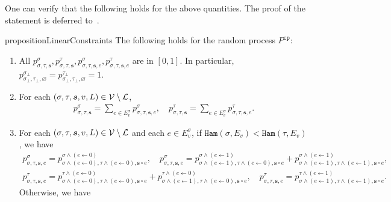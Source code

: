 \documentclass[11pt]{article}
\def\!#1{\mathtt{#1}}
\newcommand{\seqS}{\boldsymbol{s}}
\begin{document}
One can verify that the following holds for the above quantities. The proof of the statement is deferred to~.


    \begin{restatable}{proposition}{LinearConstraints}\label{prop:coupling-linear-constraint}
    The following holds for the random process $P^{\!{cp}}$:
        \begin{enumerate}[(1)]
            \item All $p^{\sigma}_{\sigma, \tau, \seqS}, p^{\tau}_{\sigma, \tau, \seqS},p^{\sigma}_{\sigma, \tau, \seqS,e}, p^{\tau}_{\sigma, \tau, \seqS,e}$ are in $[0, 1]$. 
            In particular, $p^{\sigma_\bot}_{\sigma_\bot, \tau_\bot, \varnothing} = p^{\tau_\bot}_{\sigma_\bot, \tau_\bot, \varnothing} = 1$.
            \item For each $(\sigma, \tau, \seqS, v, L)\in \+V\setminus\+L$, 
            \begin{align}\label{eqn-inter-sum1}
               p^{\sigma}_{\sigma,\tau,\seqS} = \sum_{e \in E_v^{\sigma}} p^{\sigma}_{\sigma, \tau, \seqS, e}, \quad  p^{\tau}_{\sigma,\tau,\seqS}=\sum_{e \in  E_v^{\sigma}} p^{\tau}_{\sigma,\tau, \seqS, e}.
            \end{align}
            \item For each $(\sigma, \tau, \seqS, v, L)\in \+V\setminus\+L$ and each $e\in E_v^{\sigma}$, if {${\!{Ham}\left(\sigma, {E_v}\right)} < {\!{Ham}\left(\tau,{E_v}\right)}$}, we have 
            \begin{align}\label{eqn-inner-child-sum1}
                p^{\sigma}_{\sigma,\tau, \seqS,e} = p^{\sigma \land (e\gets 0)}_{\sigma \land (e\gets 0),\tau\land (e\gets 0), \seqS \circ e}, \quad  p^{\sigma}_{\sigma, \tau, \seqS, e}=p^{\sigma\land (e\gets 1)}_{\sigma\land (e\gets 1),\tau\land (e\gets 0), \seqS\circ e} + p^{\sigma\land (e\gets 1)}_{\sigma\land (e\gets 1),\tau\land (e\gets 1),\seqS \circ e},
            \end{align}
            \begin{align}\label{eqn-inner-child-sum2}
                p^{\tau}_{\sigma, \tau, \seqS, e} = p^{\tau \land (e \gets 0)}_{\sigma \land (e\gets 0),\tau\land (e\gets 0), \seqS \circ e} + p^{\tau\land (e\gets 0)}_{\sigma\land (e\gets 1),\tau\land (e\gets 0), \seqS \circ e}, \quad  p^{\tau}_{\sigma, \tau, \seqS, e}=p^{\tau \land (e\gets 1)}_{\sigma \land (e\gets 1), \tau\land (e \gets 1), \seqS\circ e}.
            \end{align}
            Otherwise, we have
            \begin{align}\label{eqn-inner-child-sum3}

\end{align}
\end{enumerate}
\end{restatable}
\end{document}
